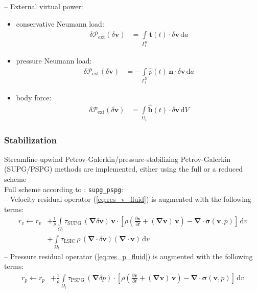 \documentclass[a4paper,12pt]{report}
\newcommand{\bs}[1]{\boldsymbol{#1}}
\newcommand{\Om}{\mathit{\Omega}}
\newcommand{\Gm}{\mathit{\Gamma}}
\begin{document}
-- External virtual power:\\
\begin{itemize}
\item conservative Neumann load:
\begin{align}
\delta \mathcal{P}_{\mathrm{ext}}(\delta\bs{v}) &= \int\limits_{\Gm_t^{\mathrm{N}}} \hat{\bs{t}}(t) \cdot \delta\bs{v} \,\mathrm{d}a \label{eq:deltaPext_neumann}
\end{align}
\item pressure Neumann load:
\begin{align}
\delta \mathcal{P}_{\mathrm{ext}}(\delta\bs{v}) &= -\int\limits_{\Gm_t^{\mathrm{N}}} \hat{p}(t)\,\bs{n} \cdot \delta\bs{v} \,\mathrm{d}a \label{eq:deltaPext_neumann_true}
\end{align}
\item body force:
\begin{align}
\delta \mathcal{P}_{\mathrm{ext}}(\delta\bs{v}) &= \int\limits_{\Om_t} \hat{\bs{b}}(t) \cdot \delta\bs{v} \,\mathrm{d}V \label{eq:deltaPext_body}
\end{align}
\end{itemize}

\subsubsection{Stabilization}\label{subsubsec:stab}
Streamline-upwind Petrov-Galerkin/pressure-stabilizing Petrov-Galerkin (SUPG/PSPG) methods are implemented, either using the full or a reduced scheme\\

Full scheme according to \cite{tezduyar2000}: \verb.supg_pspg.:\\
-- Velocity residual operator (\ref{eq:res_v_fluid}) is augmented with the following terms:
\begin{align}
r_v \leftarrow r_v &+ \frac{1}{\rho}\int\limits_{\Om_t} \tau_{\mathrm{SUPG}}\,(\bs{\nabla}\delta\bs{v})\,\bs{v} \cdot \left[\rho\left(\frac{\partial \bs{v}}{\partial t} + (\bs{\nabla}\bs{v})\,\bs{v}\right) - \bs{\nabla} \cdot \bs{\sigma}(\bs{v},p)\right]\,\mathrm{d}v \\
& + \int\limits_{\Om_t} \tau_{\mathrm{LSIC}}\,\rho\,(\bs{\nabla}\cdot\delta\bs{v})(\bs{\nabla}\cdot\bs{v})\,\mathrm{d}v
\end{align}
-- Pressure residual operator (\ref{eq:res_p_fluid}) is augmented with the following terms:
\begin{align}
r_p \leftarrow r_p &+ \frac{1}{\rho}\int\limits_{\Om_t} \tau_{\mathrm{PSPG}}\,(\bs{\nabla}\delta p) \cdot \left[\rho\left(\frac{\partial \bs{v}}{\partial t} + (\bs{\nabla}\bs{v})\,\bs{v}\right) - \bs{\nabla} \cdot \bs{\sigma}(\bs{v},p)\right]\,\mathrm{d}v 
\end{align}
\end{document}
